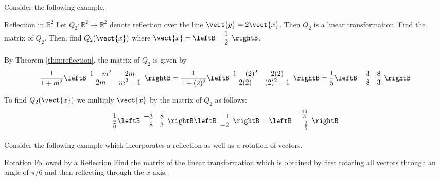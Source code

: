 Consider the following example. 

\begin{example}{Reflection in $\mathbb{R}^2$}\label{exa:reflection}
Let $Q_2: \mathbb{R}^2 \to \mathbb{R}^2$ denote reflection over the line $\vect{y}=2\vect{x}$. Then $Q_2$ is a linear transformation. Find the matrix of $Q_2$. Then, find $Q_2 (\vect{x})$ where $\vect{x} = \leftB 
\begin{array}{r}
1 \\
-2
\end{array}
\rightB$. 
\end{example}

\begin{solution}
By Theorem \ref{thm:reflection}, the matrix of $Q_2$ is given by 
\[
\frac{1}{1+m^2}
\leftB
\begin{array}{cc}
1-m^2 & 2m \\
2m & m^2-1 
\end{array}
\rightB
=
\frac{1}{1+(2)^2}
\leftB
\begin{array}{cc}
1-(2)^2 & 2(2) \\
2(2) & (2)^2-1 
\end{array}
\rightB
=
\frac{1}{5}
\leftB
\begin{array}{rr}
-3 & 8 \\
8 & 3 
\end{array}
\rightB
\]

To find $Q_2(\vect{x})$ we multiply $\vect{x}$ by the matrix of $Q_2$ as follows:
\[
\frac{1}{5}
\leftB
\begin{array}{rr}
-3 & 8 \\
8 & 3 
\end{array}
\rightB
\leftB
\begin{array}{r}
1 \\
-2
\end{array}
\rightB
=
\leftB
\begin{array}{r}
-\vspace{0.05in}\frac{19}{5} \\
\vspace{0.05in}\frac{2}{5}
\end{array}
\rightB
\]

\end{solution}

Consider the following example which incorporates a reflection as well as a rotation of vectors.

\begin{example}{Rotation Followed by a Reflection}\label{exa:rotationreflection}
Find the matrix of the linear transformation which is obtained by first
rotating all vectors through an angle of $\pi /6$ and then reflecting
through the $x$ axis.
\end{example}

